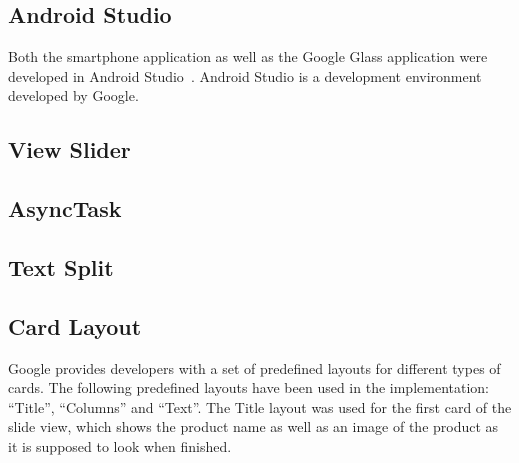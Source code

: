 

\subsection{Android Studio}
Both the smartphone application as well as the Google Glass application were developed in Android Studio~\cite{androidStudio}. Android Studio is a development environment developed by Google. %



\subsection{View Slider}


\subsection{AsyncTask}


\subsection{Text Split}


\subsection{Card Layout}
Google provides developers with a set of predefined layouts for different types of cards. The following predefined layouts have been used in the implementation: ``Title'', ``Columns'' and ``Text''. The Title layout was used for the first card of the slide view, which shows the product name as well as an image of the product as it is supposed to look when finished.

